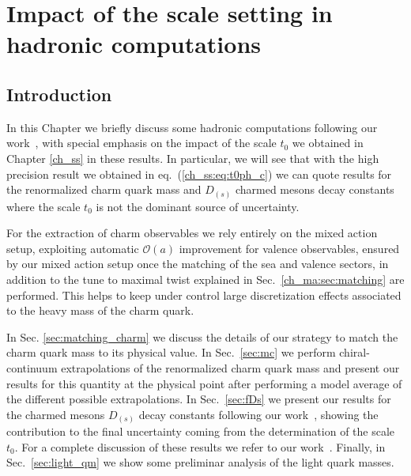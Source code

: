 \chapter{Impact of the scale setting in hadronic computations}
\label{ch_charm}


\section{Introduction}
\label{ch_qm:sec:introduction}

In this Chapter we briefly discuss some hadronic computations following our work~\citep{charm}, with special emphasis on the impact of the scale $t_0$ we obtained in Chapter \ref{ch_ss} in these results. In particular, we will see that with the high precision result we obtained in eq.~(\ref{ch_ss:eq:t0ph_c}) we can quote results for the renormalized charm quark mass and $D_{(s)}$ charmed mesons decay constants where the scale $t_0$ is not the dominant source of uncertainty. 

For the extraction of charm observables we rely entirely on the mixed action setup, exploiting automatic $\mathcal{O}(a)$ improvement for valence observables, ensured by our mixed action setup once the matching of the sea and valence sectors, in addition to the tune to maximal twist explained in Sec.~\ref{ch_ma:sec:matching} are performed. This helps to keep under control large discretization effects associated to the heavy mass of the charm quark. 

In Sec. \ref{sec:matching_charm} we discuss the details of our strategy to match the charm quark mass to its physical value. In Sec.~\ref{sec:mc} we perform chiral-continuum extrapolations of the renormalized charm quark mass and present our results for this quantity at the physical point after performing a model average of the different possible extrapolations. In Sec.~\ref{sec:fDs} we present our results for the charmed mesons $D_{(s)}$ decay constants following our work~\citep{charm}, showing the contribution to the final uncertainty coming from the determination of the scale $t_0$. For a complete discussion of these results we refer to our work~\citep{charm}. Finally, in Sec.~\ref{sec:light_qm} we show some preliminar analysis of the light quark masses. 


